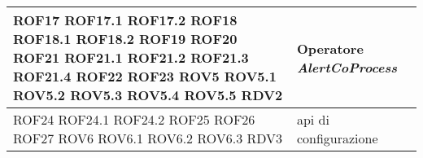 {\begin{longtable}{L{5cm} L{8.5cm}}
\hline
ROF17 \newline ROF17.1 \newline ROF17.2 \newline ROF18 \newline ROF18.1 \newline ROF18.2 \newline ROF19 \newline ROF20 \newline ROF21 \newline ROF21.1 \newline ROF21.2 \newline ROF21.3 \newline ROF21.4 \newline ROF22 \newline ROF23 \newline ROV5 \newline ROV5.1 \newline ROV5.2 \newline ROV5.3 \newline ROV5.4 \newline ROV5.5 \newline RDV2 & Operatore \textit{AlertCoProcess} \\
\hline
ROF24 \newline ROF24.1 \newline ROF24.2 \newline ROF25 \newline ROF26 \newline ROF27 \newline ROV6 \newline ROV6.1 \newline ROV6.2 \newline ROV6.3 \newline RDV3 & \gls{api} di configurazione \\
\hline
\end{longtable}
}